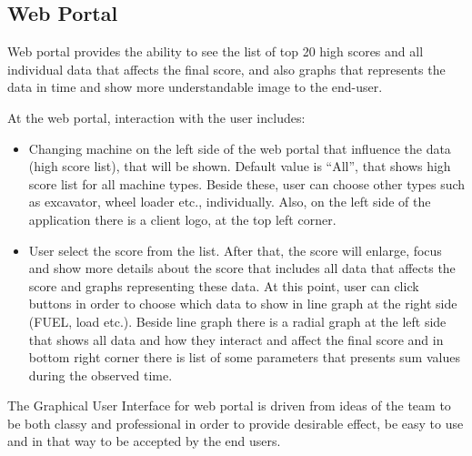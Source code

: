\documentclass{article}
\begin{document}
\subsection{Web Portal}
Web portal provides the ability to see the list of top 20 high scores and all individual data that affects the final score, and also graphs that represents the data in time and show more understandable image to the end-user.
 
At the web portal, interaction with the user includes:
\begin{itemize}
\item Changing machine on the left side of the web portal that influence the data (high score list), that will be shown. Default value is “All”, that shows high score list for all machine types. Beside these, user can choose other types such as excavator, wheel loader etc., individually. Also, on the left side of the application there is a client logo, at the top left corner.
\item User select the score from the list. After that, the score will enlarge, focus and show more details about the score that includes all data that affects the score and graphs representing these data. At this point, user can click buttons in order to choose which data to show in line graph at the right side (FUEL, load etc.). Beside line graph there is a radial graph at the left side that shows all data and how they interact and affect the final score and in bottom right corner there is list of some parameters that presents sum values during the observed time.
\end{itemize}
The Graphical User Interface for web portal is driven from ideas of the team to be both classy and professional in order to provide desirable effect, be easy to use and in that way to be accepted by the end users.
\end{document}
